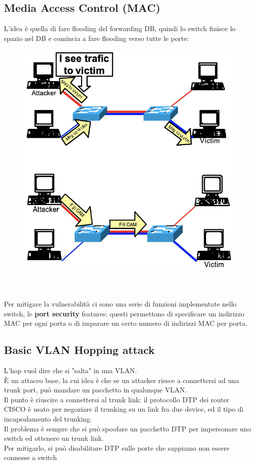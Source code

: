 \documentclass[12pt, oneside]{extbook} %
\begin{document}
\subsection{Media Access Control (MAC)}
L'idea è quella di fare flooding del forwarding DB, quindi lo switch finisce lo spazio nel DB e comincia a fare flooding verso tutte le porte:\\
    \begin{figure}[h!]
        \includegraphics[scale=0.4]{../../immagini/MAC_flooding}
    \end{figure}
\\\\Per mitigare la vulnerabilità ci sono una serie di funzioni implementate nello switch, le \textbf{port security} features: questi permettono di specificare un indirizzo MAC per ogni porta o di imparare un certo numero di indirizzi MAC per porta.

\subsection{Basic VLAN Hopping attack}
L'hop vuol dire che si "salta" in una VLAN.
\\È un attacco base, la cui idea è che se un attacker riesce a connettersi ad una trunk port, può mandare un pacchetto in qualunque VLAN.
\\Il punto è riuscire a connettersi al trunk link: il protocollo DTP dei router CISCO è usato per negoziare il trunking su un link fra due device, ed il tipo di incapsulamento del trunking.
\\ Il problema è sempre che si può spoofare un pacchetto DTP per impersonare uno switch ed ottenere un trunk link.
\\Per mitigarlo, si può disabilitare DTP sulle porte che sappiamo non essere connesse a switch
\end{document}
